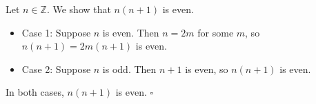 Let $n \in \mathbb{Z}$.
We show that $n(n + 1)$ is even.

\begin{itemize}
  \item Case 1: Suppose $n$ is even.
    Then $n = 2m$ for some $m$, so $n(n + 1) = 2m(n + 1)$ is even.
  \item Case 2: Suppose $n$ is odd.
    Then $n + 1$ is even, so $n(n + 1)$ is even.
\end{itemize}

In both cases, $n(n + 1)$ is even. \hfill$\square$